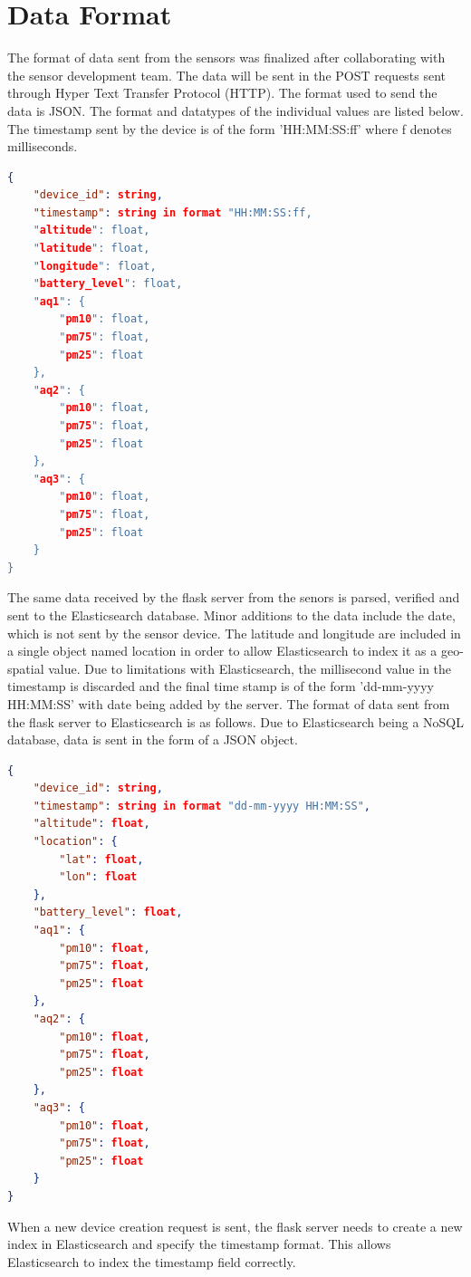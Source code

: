 \documentclass[]{report}
\begin{document}
\section{Data Format}
The format of data sent from the sensors was finalized after collaborating with the sensor development team. The data will be sent in the POST requests sent through Hyper Text Transfer Protocol (HTTP). The format used to send the data is JSON. The format and datatypes of the individual values are listed below. The timestamp sent by the device is of the form 'HH:MM:SS:ff' where f denotes milliseconds. 

\begin{lstlisting}[language=json,firstnumber=1]
{
    "device_id": string,
    "timestamp": string in format "HH:MM:SS:ff,
    "altitude": float,
    "latitude": float,
    "longitude": float,
    "battery_level": float,
    "aq1": {
        "pm10": float,
        "pm75": float,
        "pm25": float
    },
    "aq2": {
        "pm10": float,
        "pm75": float,
        "pm25": float
    },
    "aq3": {
        "pm10": float,
        "pm75": float,
        "pm25": float
    }
}
\end{lstlisting}

The same data received by the flask server from the senors is parsed, verified and sent to the Elasticsearch database. Minor additions to the data include the date, which is not sent by the sensor device. The latitude and longitude are included in a single object named location in order to allow Elasticsearch to index it as a geo-spatial value. Due to limitations with Elasticsearch, the millisecond value in the timestamp is discarded and the final time stamp is of the form 'dd-mm-yyyy HH:MM:SS' with date being added by the server. The format of data sent from the flask server to Elasticsearch is as follows. Due to Elasticsearch being a NoSQL database, data is sent in the form of a JSON object.
\begin{lstlisting}[language=json,firstnumber=1]
{
    "device_id": string,
    "timestamp": string in format "dd-mm-yyyy HH:MM:SS",
    "altitude": float,
    "location": {
        "lat": float,
        "lon": float
    },
    "battery_level": float,
    "aq1": {
        "pm10": float,
        "pm75": float,
        "pm25": float
    },
    "aq2": {
        "pm10": float,
        "pm75": float,
        "pm25": float
    },
    "aq3": {
        "pm10": float,
        "pm75": float,
        "pm25": float
    }
}
\end{lstlisting}
When a new device creation request is sent, the flask server needs to create a new index in Elasticsearch and specify the timestamp format. This allows Elasticsearch to index the timestamp field correctly. 
\end{document}

